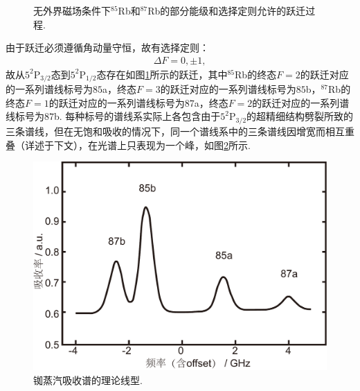 \documentclass[a4paper, 10pt]{article}
\begin{document}
\begin{multicols*}{2}
\begin{figure}[H]
    \centering
    \caption{无外界磁场条件下$^{85}$Rb和$^{87}$Rb的部分能级和选择定则允许的跃迁过程.}
    \label{energy-state}
\end{figure}

由于跃迁必须遵循角动量守恒，故有选择定则：
\begin{align}
    \label{transition-choosing-rule}
    \Delta F=0,\pm 1,
\end{align}
故从$5^2$P$_{3/2}$态到$5^2$P$_{1/2}$态存在如图\ref{energy-state}所示的跃迁，其中$^{85}$Rb的终态$F=2$的跃迁对应的一系列谱线标号为$85$a，终态$F=3$的跃迁对应的一系列谱线标号为$85$b，$^{87}$Rb的终态$F=1$的跃迁对应的一系列谱线标号为$87$a，终态$F=2$的跃迁对应的一系列谱线标号为$87$b. 每种标号的谱线系实际上各包含由于$5^2$P$_{3/2}$的超精细结构劈裂所致的三条谱线，但在无饱和吸收的情况下，同一个谱线系中的三条谱线因增宽而相互重叠（详述于下文），在光谱上只表现为一个峰，如图\ref{theoretical-absorption}所示.

\begin{figure}[H]
    \centering
    \includegraphics[width=.9\columnwidth]{TheoreticalAbsorption.pdf}
    \caption{铷蒸汽吸收谱的理论线型.}
    \label{theoretical-absorption}
\end{figure}



\end{multicols*}
\end{document}
